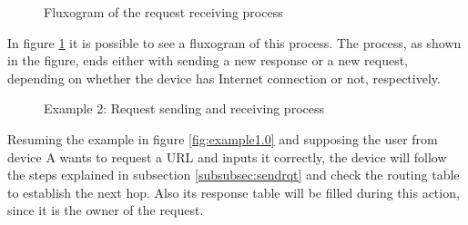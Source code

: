 \begin{figure}[ht]
   \noindent{}
	\caption{\label{fig:rqtrcvflux} Fluxogram of the request receiving process}
\end{figure}

In figure \ref{fig:rqtrcvflux} it is possible to see a fluxogram of this process. The process, as shown in the figure, ends either with sending a new response or a new request, depending on whether the device has Internet connection or not, respectively.

\begin{figure}[ht]
   \noindent{}
	\caption{\label{fig:example1.1} Example 2: Request sending and receiving process}
\end{figure}

Resuming the example in figure \ref{fig:example1.0} and supposing the user from device A wants to request a \gls{URL} and inputs it correctly, the device will follow the steps explained in subsection \ref{subsubsec:sendrqt} and check the routing table to establish the next hop. Also its response table will be filled during this action, since it is the owner of the request.

